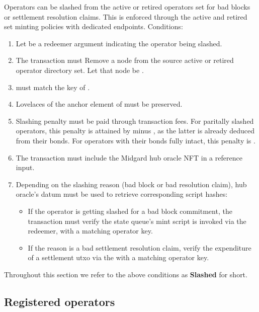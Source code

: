 \documentclass[../midgard.tex]{subfiles}
\begin{document}
Operators can be slashed from the active or retired operators set for bad blocks or settlement resolution claims.
This is enforced through the active and retired set minting policies with dedicated endpoints.
Conditions:
\begin{enumerate}
  \item Let  be a redeemer argument indicating the operator being slashed.
  \item The transaction must Remove a node from the source active or retired operator directory set.
    Let that node be .
  \item {} must match the key of .
  \item Lovelaces of the anchor element of  must be preserved.
  \item Slashing penalty must be paid through transaction fees.
    For paritally slashed operators, this penalty is attained by  minus , as the latter is already deduced from their bonds.
    For operators with their bonds fully intact, this penalty is .
  \item The transaction must include the Midgard hub oracle NFT in a reference input.
  \item Depending on the slashing reason (bad block or bad resolution claim), hub oracle's datum must be used to retrieve corresponding script hashes:
    \begin{itemize}
      \item If the operator is getting slashed for a bad block commitment, the transaction must verify the state queue's mint script is invoked via the  redeemer, with a matching operator key.
      \item If the reason is a bad settlement resolution claim, verify the expenditure of a settlement utxo via the  with a matching operator key.
    \end{itemize}
\end{enumerate}

Throughout this section we refer to the above conditions as \textbf{Slashed} for short.

\subsection{Registered operators}
\label{h:registered-operators}
\end{document}
